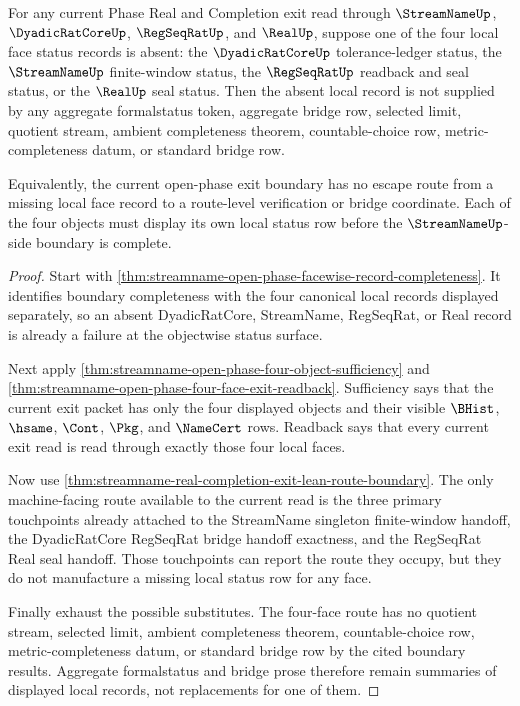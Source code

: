 \begin{theorem}
\label{thm:streamname-open-phase-local-status-nonescape}
For any current Phase Real and Completion exit read through $\StreamNameUp$, $\DyadicRatCoreUp$, $\RegSeqRatUp$, and $\RealUp$, suppose one of the four local face status records is absent: the $\DyadicRatCoreUp$ tolerance-ledger status, the $\StreamNameUp$ finite-window status, the $\RegSeqRatUp$ readback and seal status, or the $\RealUp$ seal status. Then the absent local record is not supplied by any aggregate formalstatus token, aggregate bridge row, selected limit, quotient stream, ambient completeness theorem, countable-choice row, metric-completeness datum, or standard bridge row.

Equivalently, the current open-phase exit boundary has no escape route from a missing local face record to a route-level verification or bridge coordinate. Each of the four objects must display its own local status row before the $\StreamNameUp$-side boundary is complete.
\end{theorem}
\begin{proof}
Start with \autoref{thm:streamname-open-phase-facewise-record-completeness}. It identifies boundary completeness with the four canonical local records displayed separately, so an absent DyadicRatCore, StreamName, RegSeqRat, or Real record is already a failure at the objectwise status surface.

Next apply \autoref{thm:streamname-open-phase-four-object-sufficiency} and \autoref{thm:streamname-open-phase-four-face-exit-readback}. Sufficiency says that the current exit packet has only the four displayed objects and their visible $\BHist$, $\hsame$, $\Cont$, $\Pkg$, and $\NameCert$ rows. Readback says that every current exit read is read through exactly those four local faces.

Now use \autoref{thm:streamname-real-completion-exit-lean-route-boundary}. The only machine-facing route available to the current read is the three primary touchpoints already attached to the StreamName singleton finite-window handoff, the DyadicRatCore RegSeqRat bridge handoff exactness, and the RegSeqRat Real seal handoff. Those touchpoints can report the route they occupy, but they do not manufacture a missing local status row for any face.

Finally exhaust the possible substitutes. The four-face route has no quotient stream, selected limit, ambient completeness theorem, countable-choice row, metric-completeness datum, or standard bridge row by the cited boundary results. Aggregate formalstatus and bridge prose therefore remain summaries of displayed local records, not replacements for one of them.
\end{proof}

